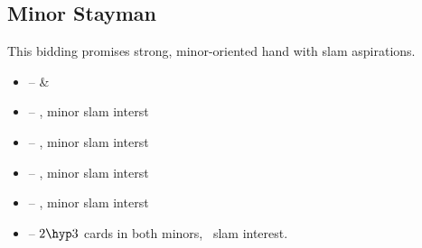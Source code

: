\subsection{Minor Stayman}
\label{subsec:minor-stayman}

\begin{flushleft}
   \linebreak
  This bidding promises strong, minor-oriented hand with slam aspirations.
\end{flushleft}
\begin{itemize}
  \item {} --  \& 
  \item \ctr{3\c} -- , minor slam interst
  \item \ctr{3\d} -- , minor slam interst
  \item \ctr{3\h} -- , minor slam interst \question
  \item \ctr{3\s} -- , minor slam interst \question
  \item {} -- $2\hyp 3$ cards in both minors, \no\ slam interest.
\end{itemize}
